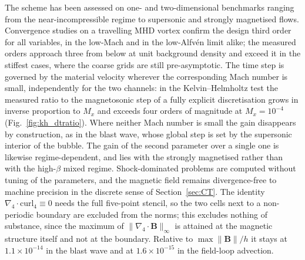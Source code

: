 \documentclass[a4paper,fleqn]{cas-sc}
\theoremstyle{remark}
\newcommand{\Bb}{\mathbf{B}}
\begin{document}
The scheme has been assessed on one- and two-dimensional benchmarks ranging from
the near-incompressible regime to supersonic and strongly magnetised flows.
Convergence studies on a travelling MHD vortex confirm the design third order
for all variables, in the low-Mach and in the low-Alfv\'en limit alike; the
measured orders approach three from below at unit background density and
exceed it in the stiffest cases, where the coarse grids are still
pre-asymptotic.
The time step is governed by the material velocity wherever the corresponding
Mach number is small, independently for the two channels: in the
Kelvin--Helmholtz test the measured ratio to the magnetosonic step of a fully
explicit discretisation grows in inverse proportion to $M_x$ and exceeds four
orders of magnitude at $M_x=10^{-4}$ (Fig.~\ref{fig:kh_dtratio}). Where
neither Mach number is small the gain disappears by construction, as in the
blast wave, whose global step is set by the supersonic interior of the bubble.
The gain of the second parameter over a single one is likewise
regime-dependent, and lies with the strongly magnetised rather than with the
high-$\beta$ mixed regime.
Shock-dominated problems are computed without tuning of the parameters, and the
magnetic field remains divergence-free to machine precision in the discrete
sense of Section~\ref{sec:CT}. The identity
$\nabla_4\!\cdot\!\mathrm{curl}_4\equiv0$ needs the full five-point stencil, so
the two cells next to a non-periodic boundary are excluded from the norms; this
excludes nothing of substance, since the maximum of
$\|\nabla_4\!\cdot\!\Bb\|_\infty$ is attained at the magnetic structure itself
and not at the boundary. Relative to $\max\|\Bb\|/h$ it stays at
$1.1\times10^{-14}$ in the blast wave and at $1.6\times10^{-15}$ in the
field-loop advection.
\end{document}
